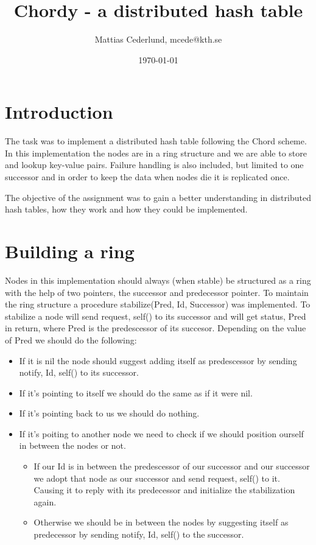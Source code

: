 \documentclass[a4paper, 11pt]{article}
\title{Chordy - a distributed hash table}
\author{Mattias Cederlund, mcede@kth.se}
\date{\today{}}
\begin{document}
\maketitle

\section{Introduction}

The task was to implement a distributed hash table following the Chord scheme. In this implementation the nodes are in a ring structure and we are able to store and lookup key-value pairs. Failure handling is also included, but limited to one successor and in order to keep the data when nodes die it is replicated once.

The objective of the assignment was to gain a better understanding in distributed hash tables, how they work and how they could be implemented.

\section{Building a ring}

Nodes in this implementation should always (when stable) be structured as a ring with the help of two pointers, the successor and predecessor pointer. To maintain the ring structure a procedure stabilize(Pred, Id, Successor) was implemented. To stabilize a node will send {request, self()} to its successor and will get {status, Pred} in return, where Pred is the predescessor of its succesor. Depending on the value of Pred we should do the following:
\begin{itemize}
	\item If it is nil the node should suggest adding itself as predescessor by sending {notify, {Id, self()}} to its successor. 
	\item If it's pointing to itself we should do the same as if it were nil. 
	\item If it's pointing back to us we should do nothing. 
	\item If it's poiting to another node we need to check if we should position ourself in between the nodes or not.
	\begin{itemize}
		\item If our Id is in between the predescessor of our successor and our successor we adopt that node as our successor and send {request, self()} to it. Causing it to reply with its predecessor and initialize the stabilization again.
		\item Otherwise we should be in between the nodes by suggesting itself as predecessor by sending {notify, {Id, self()}} to the successor.
	\end{itemize}
\end{itemize}
\end{document}
